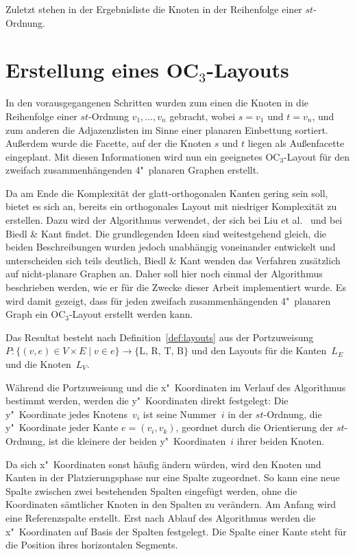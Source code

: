 \documentclass[a4paper]{scrreprt}
\theoremstyle{definition}
\begin{document}
Zuletzt stehen in der Ergebnisliste die Knoten in der Reihenfolge einer $st$-Ordnung.

\section{Erstellung eines OC$_3$-Layouts}

In den vorausgegangenen Schritten wurden zum einen die Knoten in die Reihenfolge einer $st$-Ordnung $v_1, \dots, v_n$ gebracht, wobei $s = v_1$ und $t = v_n$, und zum anderen die Adjazenzlisten im Sinne einer planaren Einbettung sortiert. Außerdem wurde die Facette, auf der die Knoten $s$ und $t$ liegen als Außenfacette eingeplant. Mit diesen Informationen wird nun ein geeignetes OC$_3$-Layout für den zweifach zusammenhängenden 4"~planaren Graphen erstellt. 

Da am Ende die Komplexität der glatt-orthogonalen Kanten gering sein soll, bietet es sich an, bereits ein orthogonales Layout mit niedriger Komplexität zu erstellen. Dazu wird der Algorithmus verwendet, der sich bei Liu et al.~\cite{liu+etal-98} und bei Biedl \& Kant \cite{biedl+kant-98} findet. Die grundlegenden Ideen sind weitestgehend gleich, die beiden Beschreibungen wurden jedoch unabhängig voneinander entwickelt und unterscheiden sich teils deutlich, Biedl \& Kant wenden das Verfahren zusätzlich auf nicht-planare Graphen an. Daher soll hier noch einmal der Algorithmus beschrieben werden, wie er für die Zwecke dieser Arbeit implementiert wurde. Es wird damit gezeigt, dass für jeden zweifach zusammenhängenden 4"~planaren Graph ein OC$_3$-Layout erstellt werden kann.

Das Resultat besteht nach Definition~\ref{def:layouts} aus der Portzuweisung $P: \{(v, e) \in V \times E \mid v \in e\} \to \{\text{L, R, T, B}\}$ und den Layouts für die Kanten~$L_E$ und die Knoten~$L_V$.

Während die Portzuweisung und die x"~Koordinaten im Verlauf des Algorithmus bestimmt werden, werden die y"~Koordinaten direkt festgelegt: Die y"~Koordinate jedes Knotens~$v_i$ ist seine Nummer~$i$ in der $st$-Ordnung, die y"~Koordinate jeder Kante $e = (v_i, v_k)$, geordnet durch die Orientierung der $st$-Ordnung, ist die kleinere der beiden y"~Koordinaten~$i$ ihrer beiden Knoten.

Da sich x"~Koordinaten sonst häufig ändern würden, wird den Knoten und Kanten in der Platzierungsphase nur eine Spalte zugeordnet. So kann eine neue Spalte zwischen zwei bestehenden Spalten eingefügt werden, ohne die Koordinaten sämtlicher Knoten in den Spalten zu verändern. Am Anfang wird eine Referenzspalte erstellt. Erst nach Ablauf des Algorithmus werden die x"~Koordinaten auf Basis der Spalten festgelegt. Die Spalte einer Kante steht für die Position ihres horizontalen Segments.
\end{document}
